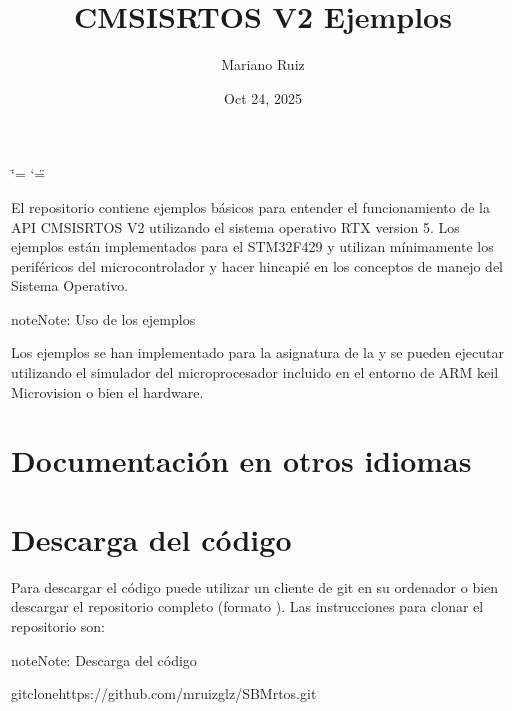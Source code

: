 \documentclass[letterpaper,10pt,english]{sphinxmanual}
\title{CMSIS\sphinxhyphen{}RTOS V2 Ejemplos}
\date{Oct 24, 2025}
\author{Mariano Ruiz}
\begin{document}
\ifdefined\shorthandoff
  \ifnum\catcode`\=\string=\active\shorthandoff{=}\fi
  \ifnum\catcode`\"=\active{}\fi
\fi

\pagestyle{empty}
\sphinxmaketitle
\pagestyle{plain}
\sphinxtableofcontents
\pagestyle{normal}
\label{\detokenize{index::doc}}
\sphinxstepscope



\sphinxAtStartPar
El repositorio contiene ejemplos básicos para entender el funcionamiento de la API CMSIS\sphinxhyphen{}RTOS V2 utilizando el sistema operativo RTX version 5. Los ejemplos están implementados para el STM32F429 y utilizan mínimamente los periféricos del microcontrolador y hacer hincapié en los conceptos de manejo del Sistema Operativo.

\begin{sphinxadmonition}{note}{Note:}
\sphinxAtStartPar
Uso de los ejemplos

\sphinxAtStartPar
Los ejemplos se han implementado para la asignatura  de la  y se pueden ejecutar utilizando el simulador del microprocesador incluido en el entorno de ARM keil Microvision o bien el hardware.
\end{sphinxadmonition}


\chapter{Documentación en otros idiomas}
\label{\detokenize{cmsis-rtos:documentacion-en-otros-idiomas}}
\sphinxAtStartPar
{}


\chapter{Descarga del código}
\label{\detokenize{cmsis-rtos:descarga-del-codigo}}
\sphinxAtStartPar
Para descargar el código puede utilizar un cliente de git en su ordenador o bien descargar el repositorio completo (formato ). Las instrucciones para clonar el repositorio son:

\begin{sphinxadmonition}{note}{Note:}
\sphinxAtStartPar
Descarga del código

\begin{sphinxVerbatim}[commandchars=\\\{\}]
\PYGZdl{}gitclonehttps://github.com/mruizglz/SBM\PYGZhy{}rtos.git
\end{sphinxVerbatim}
\end{sphinxadmonition}
\end{document}
